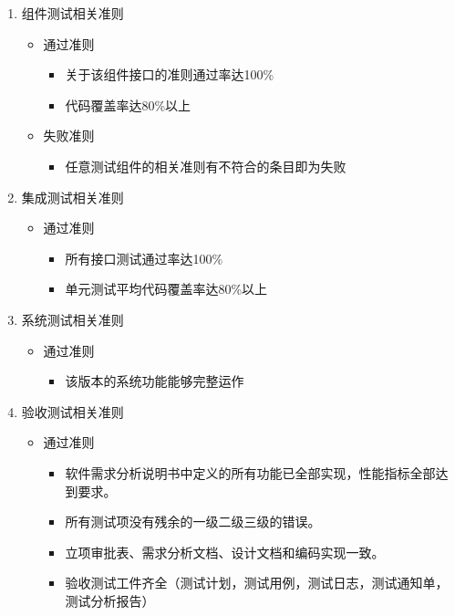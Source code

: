 \documentclass[hyperref, a4paper]{ctexart}
\providecommand{\tightlist}{%
  \setlength{\itemsep}{0pt}\setlength{\parskip}{0pt}}
\begin{document}
\begin{enumerate}
\def\labelenumi{\arabic{enumi}.}
\tightlist
\item
  组件测试相关准则

  \begin{itemize}
  \tightlist
  \item
    通过准则

    \begin{itemize}
    \tightlist
    \item
      关于该组件接口的准则通过率达100\%
    \item
      代码覆盖率达80\%以上
    \end{itemize}
  \item
    失败准则

    \begin{itemize}
    \tightlist
    \item
      任意测试组件的相关准则有不符合的条目即为失败
    \end{itemize}
  \end{itemize}
\item
  集成测试相关准则

  \begin{itemize}
  \tightlist
  \item
    通过准则

    \begin{itemize}
    \tightlist
    \item
      所有接口测试通过率达100\%
    \item
      单元测试平均代码覆盖率达80\%以上
    \end{itemize}
  \end{itemize}
\item
  系统测试相关准则

  \begin{itemize}
  \tightlist
  \item
    通过准则

    \begin{itemize}
    \tightlist
    \item
      该版本的系统功能能够完整运作
    \end{itemize}
  \end{itemize}
\item
  验收测试相关准则

  \begin{itemize}
  \tightlist
  \item
    通过准则

    \begin{itemize}
    \tightlist
    \item
      软件需求分析说明书中定义的所有功能已全部实现，性能指标全部达到要求。
    \item
      所有测试项没有残余的一级二级三级的错误。
    \item
      立项审批表、需求分析文档、设计文档和编码实现一致。
    \item
      验收测试工件齐全（测试计划，测试用例，测试日志，测试通知单，测试分析报告）
    \end{itemize}
  \end{itemize}
\end{enumerate}
\end{document}

